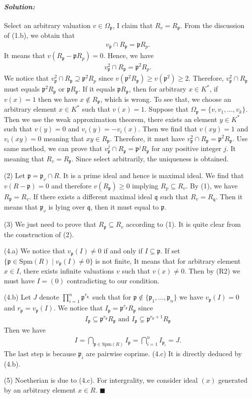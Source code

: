 \documentclass[12pt, a4paper]{article}
\newcommand{\p}{\mathfrak{p}}
\newenvironment{solution}
  {\paragraph{\textit{Solution:}}\par\medskip}
  {\hfill$\blacksquare$\vspace{0.1cm}}
\begin{document}
\begin{solution}
Select an arbitrary valuation $v\in \Omega_\p$, I claim that $R_v=R_\p$. From the discussion of (1.b), we obtain that 
\begin{align*}
    v_\p\cap R_\p = \p R_p.
\end{align*}
It means that $v(R_\p-\p R_p)= 0$. Hence, we have 
\begin{align*}
    v^2_\p\cap R_\p = \p^2 R_p.
\end{align*}
We notice that $v^2_\p\cap R_\p\supseteq \p^2 R_p$ since $v(\p^2 R_\p)\ge v(\p^2)\ge 2$. Therefore, $v^2_\p\cap R_\p$ must equals $\p^2 R_\p$ or $\p R_\p$. If it equals $\p R_\p$,
then for arbitrary $x\in K^*$, if $v(x)=1$ then we have $x\notin R_\p$, which is wrong. To see that, we choose an arbitrary element $x\in K^*$ such that $v(x)=1$.
Suppose that $\Omega_\p=\{v,v_1,\dots,v_k\}$.
Then we use the weak approximation theorem, there exists an element $y\in K^*$ such that $v(y)=0$ and $v_i(y)=-v_i(x)$.
Then we find that $v(xy)=1$ and $v_i(xy)=0$ meaning that $xy\in R_\p$. Therefore, it must have $v^2_\p\cap R_\p=\p^2 R_\p$. Use same method, we can prove that $v^j_\p\cap R_\p=\p^j R_\p$ for any positive integer $j$. 
It meaning that $R_v= R_\p$. Since select arbitrarily, the uniqueness is obtained.

(2) Let $\p=\p_v\cap R$. It is a prime ideal and hence is maximal ideal. We find that $v(R-\p)=0$ and therefore $v(R_\p)\ge 0$ implying $R_p\subseteq R_v$. 
By (1), we have $R_\p=R_v$. If there exists a different maximal ideal $\mathfrak{q}$ such that $R_v=R_\mathfrak{q}$. Then it means that $\p_v$ is lying over $\mathfrak{q}$, then it must equal to $\p$.

(3) We just need to prove that $R_\p\subseteq R_v$ according to (1). It is quite clear from the construction of (2).

(4.a) We notice that $v_{\p}(I)\neq 0$ if and only if $I\subseteq \p$. If set $\{\mathfrak{p} \in \text{Spm}(R) \mid v_{\mathfrak{p}}(I) \neq 0\}$ is not finite, It means that 
for arbitrary element $x\in I$, there exists infinite valuations $v$ such that $v(x)\neq 0$.
Then by (R2) we must have $I=(0)$ 
contradicting to our condition.

(4.b) Let $J$ denote $\prod_{i=1}^n \mathfrak{p}^{r_{\mathfrak{p_i}}}$ such that for $\p\notin\{\p_1,\dots,\p_n\}$ we have $v_\p(I)=0$ and
$r_\p=v_\p(I)$.
We notice that $I_\p = \p^{r_\p}R_\p$ since
\begin{align*}
    I_\p \subseteq \p^{r_\p}R_\p \text{ and } I_\p \subsetneq \p^{r_\p+1}R_\p
\end{align*}
Then we have 
\begin{align*}
    I= \bigcap_{\p \in \text{Spm}(R)} I_\p =\bigcap_{i=1}^{n} I_{\p_i}= J.
\end{align*}
The last step is because $\p_i$ are pairwise coprime.
(4.c) It is directly deduced by (4.b).

(5) Noetherian is due to (4.c). For intergrality, we consider ideal $(x)$ generated by an arbitrary element $x\in R$.
\end{solution}
\end{document}
